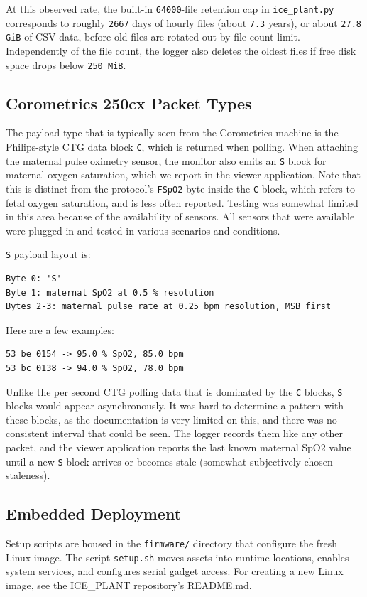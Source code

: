 \documentclass[11pt]{article}
\begin{document}
At this observed rate, the built-in \texttt{64000}-file retention cap in \texttt{ice\_plant.py} corresponds to roughly \texttt{2667} days of hourly files (about \texttt{7.3} years), or about \texttt{27.8 GiB} of CSV data, before old files are rotated out by file-count limit. Independently of the file count, the logger also deletes the oldest files if free disk space drops below \texttt{250 MiB}.

\subsection*{Corometrics 250cx Packet Types}
The payload type that is typically seen from the Corometrics machine is the Philips-style CTG data block \texttt{C}, which is returned when polling. When attaching the maternal pulse oximetry sensor, the monitor also emits an \texttt{S} block for maternal oxygen saturation, which we report in the viewer application. Note that this is distinct from the protocol's \texttt{FSpO2} byte inside the \texttt{C} block, which refers to fetal oxygen saturation, and is less often reported. Testing was somewhat limited in this area because of the availability of sensors. All sensors that were available were plugged in and tested in various scenarios and conditions.

\texttt{S} payload layout is:
\begin{verbatim}
Byte 0: 'S'
Byte 1: maternal SpO2 at 0.5 % resolution
Bytes 2-3: maternal pulse rate at 0.25 bpm resolution, MSB first
\end{verbatim}

Here are a few examples:
\begin{verbatim}
53 be 0154 -> 95.0 % SpO2, 85.0 bpm
53 bc 0138 -> 94.0 % SpO2, 78.0 bpm
\end{verbatim}

Unlike the per second CTG polling data that is dominated by the \texttt{C} blocks, \texttt{S} blocks would appear asynchronously. It was hard to determine a pattern with these blocks, as the documentation is very limited on this, and there was no consistent interval that could be seen. The logger records them like any other packet, and the viewer application reports the last known maternal SpO2 value until a new \texttt{S} block arrives or becomes stale (somewhat subjectively chosen staleness).

\subsection*{Embedded Deployment}
Setup scripts are housed in the \texttt{firmware/} directory that configure the fresh Linux image. The script \texttt{setup.sh} moves assets into runtime locations, enables system services, and configures serial gadget access. For creating a new Linux image, see the ICE\_PLANT repository's README.md. 
\end{document}
